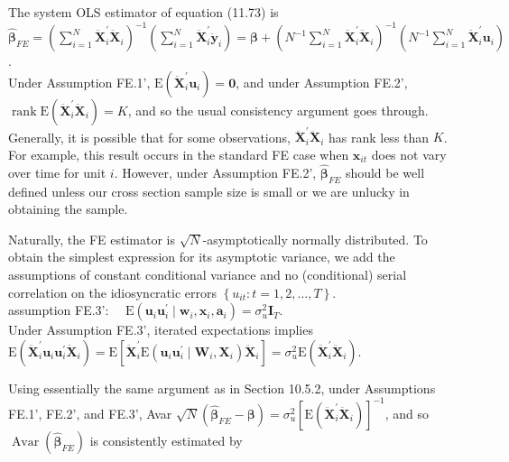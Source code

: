 \documentclass[10pt]{article}
\begin{document}
The system OLS estimator of equation (11.73) is\\
$\hat{\boldsymbol{\beta}}_{F E}=\left(\sum_{i=1}^{N} \ddot{\mathbf{X}}_{i}^{\prime} \ddot{\mathbf{X}}_{i}\right)^{-1}\left(\sum_{i=1}^{N} \ddot{\mathbf{X}}_{i}^{\prime} \ddot{\mathbf{y}}_{i}\right)=\boldsymbol{\beta}+\left(N^{-1} \sum_{i=1}^{N} \ddot{\mathbf{X}}_{i}^{\prime} \ddot{\mathbf{X}}_{i}\right)^{-1}\left(N^{-1} \sum_{i=1}^{N} \ddot{\mathbf{X}}_{i}^{\prime} \mathbf{u}_{i}\right)$.\\
Under Assumption FE.1', $\mathrm{E}\left(\ddot{\mathbf{X}}_{i}^{\prime} \mathbf{u}_{i}\right)=\mathbf{0}$, and under Assumption FE.2', $\operatorname{rank} \mathrm{E}\left(\ddot{\mathbf{X}}_{i}^{\prime} \ddot{\mathbf{X}}_{i}\right) =K$, and so the usual consistency argument goes through. Generally, it is possible that for some observations, $\ddot{\mathbf{X}}_{i}^{\prime} \ddot{\mathbf{X}}_{i}$ has rank less than $K$. For example, this result occurs in the standard FE case when $\mathbf{x}_{i t}$ does not vary over time for unit $i$. However, under Assumption FE.2', $\hat{\boldsymbol{\beta}}_{F E}$ should be well defined unless our cross section sample size is small or we are unlucky in obtaining the sample.

Naturally, the FE estimator is $\sqrt{N}$-asymptotically normally distributed. To obtain the simplest expression for its asymptotic variance, we add the assumptions of constant conditional variance and no (conditional) serial correlation on the idiosyncratic errors $\left\{u_{i t}: t=1,2, \ldots, T\right\}$.\\
assumption FE.3': $\quad \mathrm{E}\left(\mathbf{u}_{i} \mathbf{u}_{i}^{\prime} \mid \mathbf{w}_{i}, \mathbf{x}_{i}, \mathbf{a}_{i}\right)=\sigma_{u}^{2} \mathbf{I}_{T}$.\\
Under Assumption FE.3', iterated expectations implies\\
$\mathrm{E}\left(\ddot{\mathbf{X}}_{i}^{\prime} \mathbf{u}_{i} \mathbf{u}_{i}^{\prime} \ddot{\mathbf{X}}_{i}\right)=\mathrm{E}\left[\ddot{\mathbf{X}}_{i}^{\prime} \mathrm{E}\left(\mathbf{u}_{i} \mathbf{u}_{i}^{\prime} \mid \mathbf{W}_{i}, \mathbf{X}_{i}\right) \ddot{\mathbf{X}}_{i}\right]=\sigma_{u}^{2} \mathrm{E}\left(\ddot{\mathbf{X}}_{i}^{\prime} \ddot{\mathbf{X}}_{i}\right)$.

Using essentially the same argument as in Section 10.5.2, under Assumptions FE.1', FE.2', and FE.3', Avar $\sqrt{N}\left(\hat{\boldsymbol{\beta}}_{F E}-\boldsymbol{\beta}\right)=\sigma_{u}^{2}\left[\mathrm{E}\left(\ddot{\mathbf{X}}_{i}^{\prime} \ddot{\mathbf{X}}_{i}\right)\right]^{-1}$, and so $\operatorname{Avar}\left(\hat{\boldsymbol{\beta}}_{F E}\right)$ is consistently estimated by
\end{document}
